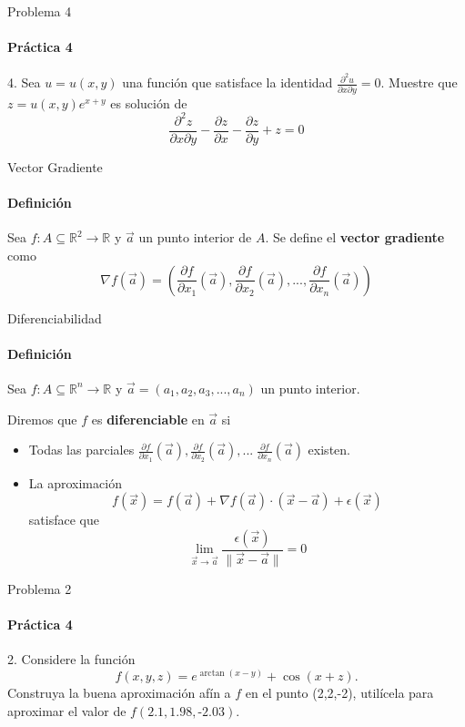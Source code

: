 \documentclass{plantillaPPt}
\begin{document}
\primeraDiapo


\begin{frame}{Problema 4}
\framesubtitle{Práctica 4}

4. Sea \(u = u(x,y)\) una función que satisface la identidad \(\frac{\partial^2u}{\partial x\partial y}=0\). Muestre que \(z=u(x,y)e^{x+y}\) es solución de
\[
\frac{\partial^2z}{\partial x\partial y}-\frac{\partial z}{\partial x}-\frac{\partial z}{\partial y}+z =0
\]
    
\end{frame}

\begin{frame}{Vector Gradiente}
\framesubtitle{Definición}

\begin{definicion}
    Sea \(f:A\subseteq\mathbb{R}^2\to\mathbb{R}\) y \(\vec{a}\) un punto interior de \(A\). Se define el \textbf{vector gradiente} como
    \[
    \nabla f(\vec{a}) = \left(\frac{\partial f}{\partial x_1}(\vec{a}), \frac{\partial f}{\partial x_2}(\vec{a}),...,\frac{\partial f}{\partial x_n}(\vec{a})\right)
    \]
\end{definicion}
    
\end{frame}

\begin{frame}{Diferenciabilidad}
\framesubtitle{Definición}

\begin{definicion}
    Sea \(f:A\subseteq\mathbb{R}^n\to\mathbb{R}\) y \(\vec{a}=(a_1,a_2,a_3,...,a_n)\) un punto interior.

    Diremos que \(f\) es \textbf{diferenciable} en \(\vec{a}\) si
    \begin{itemize}
        \item Todas las parciales \(\frac{\partial f}{\partial x_1}(\vec{a}), \frac{\partial f}{\partial x_2}(\vec{a}), ...\;\frac{\partial f}{\partial x_n}(\vec{a})\) existen.
        \item La aproximación
        \[
        f(\vec{x}) = f(\vec{a}) + \nabla f(\vec{a}) \cdot (\vec{x}-\vec{a}) + \epsilon(\vec{x})
        \]
        satisface que
        \[
        \lim_{\vec{x}\to\vec{a}}\frac{\epsilon(\vec{x})}{\|\vec{x}-\vec{a}\|}=0
        \]
    \end{itemize}
\end{definicion}
\end{frame}

\begin{frame}{Problema 2}
\framesubtitle{Práctica 4}
2. Considere la función
\[
f(x,y,z) = e^{\arctan(x-y)}+\cos(x+z).
\]
Construya la buena aproximación afín a \(f\) en el punto (2,2,-2), utilícela para aproximar el valor de \(f(\text{2.1},\text{1.98},\text{-2.03})\).
    
\end{frame}
\end{document}
